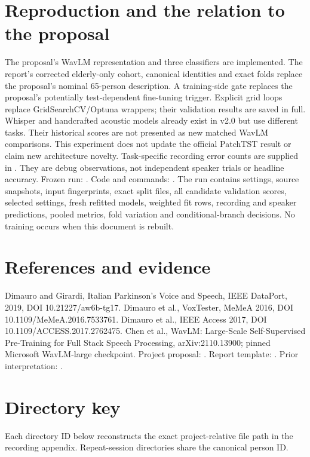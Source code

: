 \documentclass[11pt,a4paper]{article}
\begin{document}
\section{Reproduction and the relation to the proposal}
The proposal's WavLM representation and three classifiers are implemented.
The report's corrected elderly-only cohort, canonical identities and exact folds
replace the proposal's nominal 65-person description. A training-side gate replaces
the proposal's potentially test-dependent fine-tuning trigger. Explicit grid loops
replace GridSearchCV/Optuna wrappers; their validation results are saved in full.
Whisper and handcrafted acoustic models already exist in v2.0 but use different
tasks. Their historical scores are not presented as new matched WavLM comparisons.
This experiment does not update the official PatchTST result or claim new architecture novelty.
Task-specific recording error counts are supplied in .
They are debug observations, not independent speaker trials or headline accuracy.
Frozen run: .
Code and commands: .
The run contains settings, source snapshots, input fingerprints, exact split files,
all candidate validation scores, selected settings, fresh refitted models, weighted
fit rows, recording and speaker predictions, pooled metrics, fold variation and
conditional-branch decisions. No training occurs when this document is rebuilt.
\section*{References and evidence}
Dimauro and Girardi, Italian Parkinson's Voice and Speech, IEEE DataPort, 2019,
DOI 10.21227/aw6b-tg17. Dimauro et al., VoxTester, MeMeA 2016,
DOI 10.1109/MeMeA.2016.7533761. Dimauro et al., IEEE Access 2017,
DOI 10.1109/ACCESS.2017.2762475.
Chen et al., WavLM: Large-Scale Self-Supervised Pre-Training for Full Stack Speech
Processing, arXiv:2110.13900; pinned Microsoft WavLM-large checkpoint.
Project proposal: .
Report template: .
Prior interpretation: .
\clearpage\appendix\section{Directory key}
Each directory ID below reconstructs the exact project-relative file path in the
recording appendix. Repeat-session directories share the canonical person ID.
\end{document}
